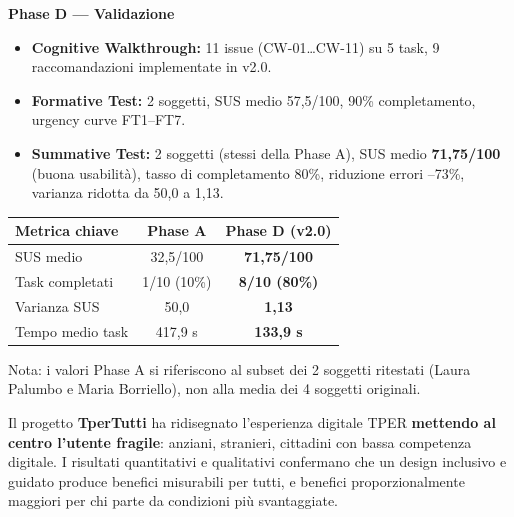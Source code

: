 ﻿\documentclass[11pt,a4paper]{article}
\begin{document}
\begin{tcolorbox}[sectionbox]
\vspace{0.2cm}

\noindent\textbf{Phase D --- Validazione}
\begin{itemize}[leftmargin=*]
  \item \textbf{Cognitive Walkthrough:} 11 issue (CW-01\ldots{}CW-11) su 5 task, 9 raccomandazioni implementate in v2.0.
  \item \textbf{Formative Test:} 2 soggetti, SUS medio 57,5/100, 90\% completamento, urgency curve FT1--FT7.
  \item \textbf{Summative Test:} 2 soggetti (stessi della Phase A), SUS medio \textbf{71,75/100} (buona usabilità), tasso di completamento 80\%, riduzione errori --73\%, varianza ridotta da 50,0 a 1,13.
\end{itemize}

\vspace{0.2cm}

\begin{center}
\renewcommand{\arraystretch}{1.3}
\begin{tabular}{lcc}
\toprule
\textbf{Metrica chiave} & \textbf{Phase A} & \textbf{Phase D (v2.0)} \\
\midrule
SUS medio & 32,5/100 & \textbf{71,75/100} \\
Task completati & 1/10 (10\%) & \textbf{8/10 (80\%)} \\
Varianza SUS & 50,0 & \textbf{1,13} \\
Tempo medio task & 417,9 s & \textbf{133,9 s} \\
\bottomrule
\end{tabular}
\end{center}

\vspace{0.2cm}
\small Nota: i valori Phase A si riferiscono al subset dei 2 soggetti ritestati (Laura Palumbo e Maria Borriello), non alla media dei 4 soggetti originali.

\vspace{0.2cm}

\noindent Il progetto \textbf{TperTutti} ha ridisegnato l'esperienza digitale TPER \textbf{mettendo al centro l'utente fragile}: anziani, stranieri, cittadini con bassa competenza digitale. I risultati quantitativi e qualitativi confermano che un design inclusivo e guidato produce benefici misurabili per tutti, e benefici proporzionalmente maggiori per chi parte da condizioni più svantaggiate.

\end{tcolorbox}
\end{document}

